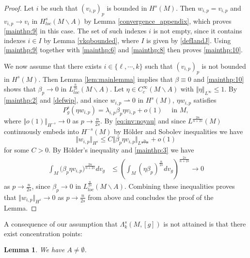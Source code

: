 \documentclass[10pt]{amsart}
\numberwithin{equation}{section}
\theoremstyle{plain}
\newtheorem{lemme}{Lemma}[section]%
\theoremstyle{remark}
\begin{document}
\begin{proof}
Let $i$ be such that $(v_{i,p})_p$ is bounded in $H^s(M)$. Then $w_{i,p} = v_{i,p}$ and $v_{i,p} \to v_i$ in $H^s_{loc}(M \backslash A)$ by Lemma \ref{convergence_appendix}, which proves \eqref{mainthp:9} in this case. The set of such indexes $i$ is not empty, since it contains indexes $i \in I$ by Lemma \ref{vkqbounded}, where $I$ is given by \eqref{defIandJ}. Using \eqref{mainthp:9} together with \eqref{mainthp:6} and \eqref{mainthp:8} then proves \eqref{mainthp:10}.  

We now assume that there exists $i\in \{\ell, \cdots, k \}$ such that $(v_{i,p})_p$ is not bounded in $H^s(M)$. Then Lemma \ref{lem:mainlemma} implies that $\beta \equiv 0$ and \eqref{mainthp:10} shows that $\beta_p \to 0$ in $L^{\frac{n}{2s}}_{loc}(M \backslash A)$. Let $\eta \in C^\infty_c(M\backslash A)$ with $\Vert \eta \Vert_{L^\infty} \le 1$. By \eqref{mainthp:2} and \eqref{defwip}, and since $w_{i,p} \rightharpoonup 0$ in $H^s(M)$, $\eta w_{i,p}$ satisfies
$$ P_g^s (\eta w_{i,p})  = \lambda_{i,p} \beta_p \eta v_{i,p} + o(1) \quad \text{ in } M, $$
where $\Vert o(1) \Vert_{H^{-s}} \to 0$ as $p \to \frac{n}{2s}$. By \eqref{eq:inv:noyau} and since $L^{\frac{2n}{n+2s}}(M)$ continuously embeds into $H^{-s}(M)$ by H\"older and Sobolev inequalities we have
$$ \Vert w_{i,p} \Vert_{H^s} \le C \Vert \beta_p \eta v_{i,p} \Vert_{L^{\frac{2n}{n+2s}}} + o(1) $$
for some $C>0$. %
By H\"older's inequality and \eqref{mainthp:3} we have
$$ 
\begin{aligned} 
\int_M\big( \beta_p \eta v_{i,p} \big)^{\frac{2n}{n+2s}} dv_g  & \le \left(\int_M (\eta \beta_p)^{\frac{n}{2s}} dv_g \right)^{\frac{2s}{n+2s}} \to 0 %
\end{aligned} $$
as $p \to \frac{n}{2s}$, since $\beta_p \to 0$ in $L^{\frac{n}{2s}}_{loc}(M \backslash A)$. Combining these inequalities proves that $\Vert w_{i,p} \Vert_{H^s} \to 0$ as $p  \to \frac{n}{2s}$ from above and concludes the proof of the Lemma. 
\end{proof}
 A consequence of our assumption that $\Lambda_k^s(M,[g])$ is not attained is that there exist concentration points: 

\begin{lemme} \label{lem:Anonvide}
We have $A \neq \emptyset$. 
\end{lemme}
\end{document}
